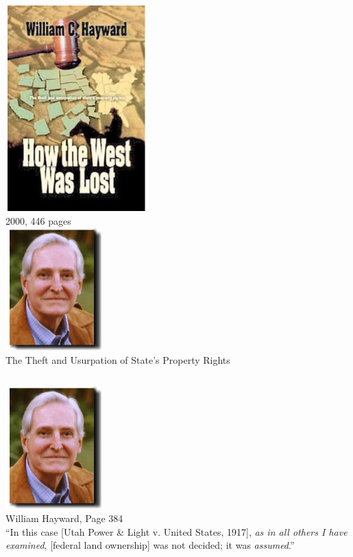 \begin{frame}
    \begin{columns}[c]
            \centering
            \includegraphics[height=0.75\textheight]{img/htwwl.png} \\
            2000, 446 pages \\
            \centering
            \includegraphics[height=0.35\textheight]{img/william-hayward.png} \\
            { \large The Theft and Usurpation of State's Property Rights }
    \end{columns}
\end{frame}

\begin{frame}
    \begin{columns}[c]
            \centering
            \includegraphics[height=0.35\textheight]{img/william-hayward.png} \\
            William Hayward, Page 384 \\
            ``In this case [Utah Power \& Light v. United States, 1917], \emph{as in all others I have examined}, [federal land ownership] was not decided; it was \emph{assumed}.''
    \end{columns}
\end{frame}

